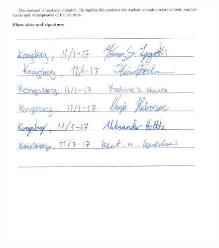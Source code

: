 \documentclass{article}
\begin{document}
\begin{figure}


\includegraphics[scale = 1.6]{VAPIQ-PICTURES/gruppekontrakt.JPG}

\end{figure}
\end{document}
